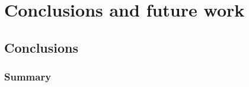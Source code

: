 \chapter{Conclusions and future work}\label{ch:conclusions}

\section{Conclusions}

	\subsection{Summary}
	
	


	



